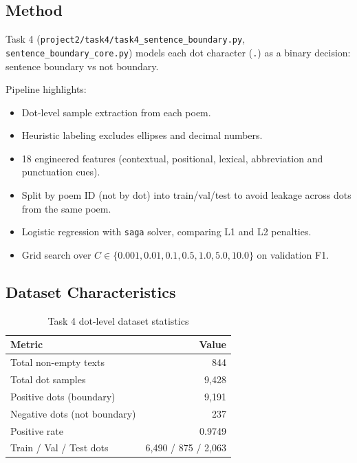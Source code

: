 \documentclass[10pt,a4paper]{article}
\begin{document}
\subsection{Method}
Task 4 (\texttt{project2/task4/task4\_sentence\_boundary.py}, \texttt{sentence\_boundary\_core.py}) models each dot character (\texttt{.}) as a binary decision: sentence boundary vs not boundary.

Pipeline highlights:
\begin{itemize}
    \item Dot-level sample extraction from each poem.
    \item Heuristic labeling excludes ellipses and decimal numbers.
    \item 18 engineered features (contextual, positional, lexical, abbreviation and punctuation cues).
    \item Split by poem ID (not by dot) into train/val/test to avoid leakage across dots from the same poem.
    \item Logistic regression with \texttt{saga} solver, comparing L1 and L2 penalties.
    \item Grid search over $C \in \{0.001,0.01,0.1,0.5,1.0,5.0,10.0\}$ on validation F1.
\end{itemize}

\subsection{Dataset Characteristics}
\begin{table}[H]
\centering
\caption{Task 4 dot-level dataset statistics}
\label{tab:task4-data}
\begin{tabular}{lr}
\toprule
\textbf{Metric} & \textbf{Value} \\
\midrule
Total non-empty texts & 844 \\
Total dot samples & 9,428 \\
Positive dots (boundary) & 9,191 \\
Negative dots (not boundary) & 237 \\
Positive rate & 0.9749 \\
Train / Val / Test dots & 6,490 / 875 / 2,063 \\
\bottomrule
\end{tabular}
\end{table}
\end{document}
